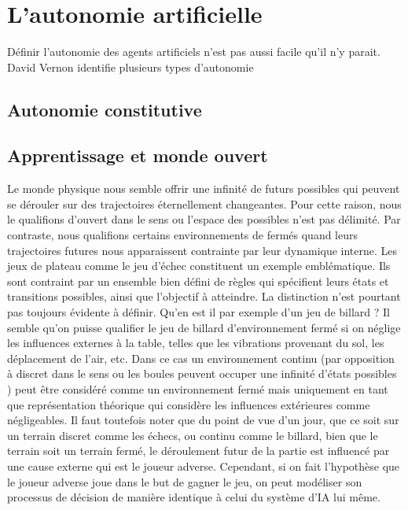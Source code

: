 \chapter{L'autonomie artificielle}

\noindent
Définir l'autonomie des agents artificiels n'est pas aussi facile qu'il n'y parait. 
David Vernon \cite{vernon_artificial_2014} identifie plusieurs types d'autonomie

\section{Autonomie constitutive}

\section{Apprentissage et monde \og ouvert \fg}

Le monde physique nous semble offrir une infinité de futurs possibles qui peuvent se dérouler sur des trajectoires éternellement changeantes. 
Pour cette raison, nous le qualifions \og d'ouvert \fg dans le sens ou l'espace des possibles n'est pas délimité.
Par contraste, nous qualifions certains environnements de \og fermés \fg quand leurs trajectoires futures nous apparaissent contrainte par leur dynamique interne. 
Les jeux de plateau comme le jeu d'échec constituent un exemple emblématique. 
Ils sont contraint par un ensemble bien défini de règles qui spécifient leurs états et transitions possibles, ainsi que l'objectif à atteindre. 
La distinction n'est pourtant pas toujours évidente à définir. 
Qu'en est il par exemple d'un jeu de billard ? 
Il semble qu'on puisse qualifier le jeu de billard d'environnement fermé si on néglige les influences externes à la table, telles que les vibrations provenant du sol, les déplacement de l'air, etc. 
Dans ce cas un environnement \og continu \fg (par opposition à \og discret \fg dans le sens ou les boules peuvent occuper une infinité d'états possibles ) peut être considéré comme un environnement fermé mais uniquement en tant que représentation théorique qui considère les influences extérieures comme négligeables. 
Il faut toutefois noter que du point de vue d'un jour, que ce soit sur un terrain discret comme les échecs, ou continu comme le billard, bien que le terrain soit un terrain fermé, le déroulement futur de la partie est influencé par une cause externe qui est le joueur adverse. 
Cependant, si on fait l'hypothèse que le joueur adverse joue dans le but de gagner le jeu, on peut modéliser son processus de décision de manière identique à celui du système d'IA lui même. 

